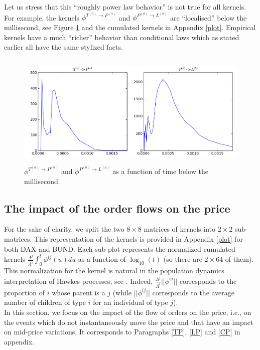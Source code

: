 \documentclass[a4paper,11pt]{article}
\newcommand{\PA}{P^{(a)}}
\newcommand{\TA}{T^{(a)}}
\newcommand{\LA}{L^{(a)}}
\begin{document}
\noindent Let us stress that this ``roughly power law behavior'' is not true for all kernels. For example, the kernels $\phi^{\TA\rightarrow \PA}$ and $\phi^{\PA\rightarrow \LA}$ are ``localised'' below the millisecond, see Figure \ref{loc} and the cumulated kernels in Appendix \ref{plot}. Empirical kernels have a much ``richer'' behavior than conditional laws which as stated earlier all have the same stylized facts.
\begin{figure}[H]
\centering
\includegraphics[width=\textwidth,height=55mm]{plotphiloc.png}
\vspace{-18pt}
\caption{$\phi^{\TA\rightarrow \PA}$ and $\phi^{\PA\rightarrow \LA}$ as a function of time below the millisecond.}
\label{loc}
\end{figure}

\subsection{The impact of the order flows on the price}

For the sake of clarity, we split the two $8 \times 8$ matrices of kernels into $2\times 2$ sub-matrices.  This representation of the kernels is provided in Appendix \ref{plot} for both DAX and BUND.
Each sub-plot represents the normalized cumulated kernels
$\frac{\Lambda^j}{\Lambda^i}\int_0^t \phi^{ij}(u) du$ as a function of $\log_{10}(t)$  (so there are $2\times 64$ of them).
This normalization for the kernel is natural in the population dynamics interpretation of Hawkes processes, see \cite{hawkes1974cluster}. Indeed, $\frac{\Lambda^j}{\Lambda^i}||\phi^{ij}||$ corresponds to the proportion of $i$ whose parent is a $j$ (while $||\phi^{ij}||$ corresponds to the average number of children of type $i$ for an individual of type $j$).\\

\noindent In this section, we focus on the impact of the flow of orders on the price, i.e., on the events which do not instantaneously move the price and that have an impact on mid-price variations.
It corresponds to Paragraphs \ref{TP}, \ref{LP} and \ref{CP} in appendix.\\
\end{document}
